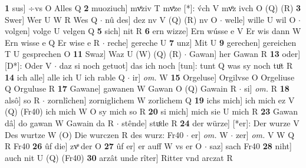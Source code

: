 \documentclass[8pt,a4paper,notitlepage]{article}
\begin{document}
\begin{table}[ht]
\begin{minipage}[t]{0.5\linewidth}
\textbf{1} sus] ÷vs O Alles Q \textbf{2} muoziuch] mvͦziv T mvͤze [*]: v́ch V mvͦz ivch O (Q) (R) \textbf{3} Swer] Wer U W R Wes Q  $\cdot$ nû des] dez nv V (Q) (R) nv O  $\cdot$ welle] wille U wil O  $\cdot$ volgen] volge U velgen Q \textbf{5} sich] nit R \textbf{6} ern wizze] Ern wússe e V Er wis dann W Ern wisse e Q Er wise e R  $\cdot$ reche] gereche U \textbf{7} unz] Mit U \textbf{9} gerechen] gereichen T U gesprechen O \textbf{11} Swaz] Waz U (W) (Q) (R)  $\cdot$ Gawan] her Gawan R \textbf{13} oder] [D*]: Oder V  $\cdot$ daz si noch getuot] das ich noch [tun]: tunt Q was sy noch tuͦt R \textbf{14} ich alle] alle ich U ich rable Q  $\cdot$ ir] \textit{om.} W \textbf{15} Orgeluse] Orgilvse O Orgeliuse Q Orguluse R \textbf{17} Gawane] gawanen W Gawan O (Q) Gawain R  $\cdot$ si] \textit{om.} R \textbf{18} alsô] so R  $\cdot$ zornlîchen] zorniglichem W zorlichem Q \textbf{19} ichs mich] ich mich ez V (Q) (Fr40) ich mich W O sy mich so R \textbf{20} si mich] mich sie U mich R \textbf{23} Gawan dâ] do gawan W Gawain da R  $\cdot$ stênde] stuͦde R \textbf{24} der würze] [*er]: Der wurze V Des wurtze W (O) Die wurczen R des wurz: Fr40  $\cdot$ er] \textit{om.} W  $\cdot$ zer] \textit{om.} V W Q R Fr40 \textbf{26} ûf die] zvͦ der O \textbf{27} ûf er] er auff W vs er O  $\cdot$ saz] sach Fr40 \textbf{28} niht] auch nit U (Q) (Fr40) \textbf{30} arzât unde rîter] Ritter vnd arczat R \newline
\end{minipage}
\end{table}
\end{document}
